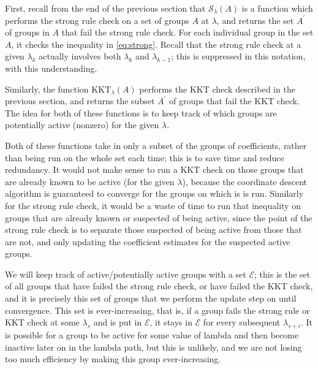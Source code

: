 \documentclass[12pt]{article}
\begin{document}
First, recall from the end of the previous section that $\mathcal{S}_{\lambda}(A)$ is a function which performs the strong rule check on a set of groups $A$ at $\lambda$, and returns the set $A^{\prime}$ of groups in $A$ that fail the strong rule check. For each individual group in the set $A$, it checks the inequality in \autoref{eq:strong}. Recall that the strong rule check at a given $\lambda_k$ actually involves both $\lambda_{k}$ and $\lambda_{k-1}$; this is suppressed in this notation, with this understanding.

Similarly, the function $\textrm{KKT}_{\lambda} (A)$ performs the KKT check described in the previous section, and returns the subset $A^{\prime}$ of groups that fail the KKT check. The idea for both of these functions is to keep track of which groups are potentially active (nonzero) for the given $\lambda$. 

Both of these functions take in only a subset of the groups of coefficients, rather than being run on the whole set each time; this is to save time and reduce redundancy. It would not make sense to run a KKT check on those groups that are already known to be active (for the given $\lambda$), because the coordinate descent algorithm is guaranteed to converge for the groups on which is is run. Similarly for the strong rule check, it would be a waste of time to run that inequality on groups that are already known or suspected of being active, since the point of the strong rule check is to separate those suspected of being active from those that are not, and only updating the coefficient estimates for the suspected active groups.

We will keep track of active/potentially active groups with a set $\mathcal{E}$; this is the set of all groups that have failed the strong rule check, or have failed the KKT check, and it is precisely this set of groups that we perform the update step on until convergence. This set is ever-increasing, that is, if a group fails the strong rule or KKT check at some $\lambda_s$ and is put in $\mathcal{E}$, it stays in $\mathcal{E}$ for every subsequent $\lambda_{s+i}$. It is possible for a group to be active for some value of lambda and then become inactive later on in the lambda path, but this is unlikely, and we are not losing too much efficiency by making this group ever-increasing.


\end{document}
